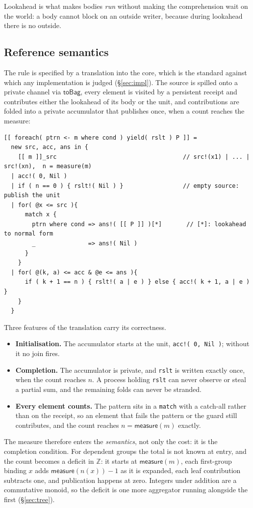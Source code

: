 \documentclass[11pt]{article}
\theoremstyle{definition}
\theoremstyle{plain}
\theoremstyle{remark}
\newcommand{\meas}{\mathsf{measure}}
\begin{document}
Lookahead is what makes bodies \emph{run} without making the comprehension
wait on the world: a body cannot block on an outside writer, because during
lookahead there is no outside.

\subsection{Reference semantics}
\label{sec:refsem}

The rule is specified by a translation into the core, which is the standard
against which any implementation is judged (\S\ref{sec:impl}). The source is
spilled onto a private channel via \(\mathsf{toBag}\), every element is
visited by a persistent receipt and contributes either the lookahead of its
body or the unit, and contributions are folded into a private accumulator that
publishes once, when a count reaches the measure:
\begin{lstlisting}
[[ foreach( ptrn <- m where cond ) yield( rslt ) P ]] =
  new src, acc, ans in {
    [[ m ]]_src                                    // src!(x1) | ... | src!(xn),  n = measure(m)
  | acc!( 0, Nil )
  | if ( n == 0 ) { rslt!( Nil ) }                 // empty source: publish the unit
  | for( @x <= src ){
      match x {
        ptrn where cond => ans!( [[ P ]] )[*]       // [*]: lookahead to normal form
        _               => ans!( Nil )
      }
    }
  | for( @(k, a) <= acc & @e <= ans ){
      if ( k + 1 == n ) { rslt!( a | e ) } else { acc!( k + 1, a | e ) }
    }
  }
\end{lstlisting}
Three features of the translation carry its correctness.
\begin{itemize}[nosep]
\item \textbf{Initialisation.} The accumulator starts at the unit,
\texttt{acc!( 0, Nil )}; without it no join fires.
\item \textbf{Completion.} The accumulator is private, and \texttt{rslt} is
written exactly once, when the count reaches \(n\). A process holding
\texttt{rslt} can never observe or steal a partial sum, and the remaining folds
can never be stranded.
\item \textbf{Every element counts.} The pattern sits in a \texttt{match} with a
catch-all rather than on the receipt, so an element that fails the pattern or
the guard still contributes, and the count reaches \(n =\meas(m)\) exactly.
\end{itemize}
The measure therefore enters the \emph{semantics}, not only the cost: it is the
completion condition. For dependent groups the total is not known at entry, and
the count becomes a deficit in \(\mathbb{Z}\): it starts at \(\meas(m)\), each
first-group binding \(x\) adds \(\meas(n(x)) - 1\) as it is expanded, each leaf
contribution subtracts one, and publication happens at zero. Integers under
addition are a commutative monoid, so the deficit is one more aggregator
running alongside the first (\S\ref{sec:tree}).
\end{document}

